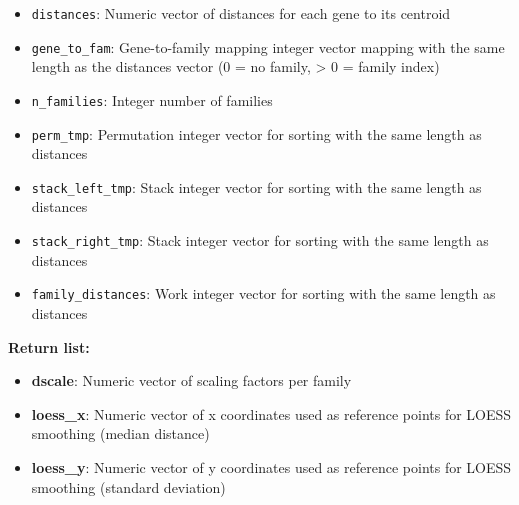 \documentclass[11pt]{article}
\begin{document}
\begin{enumerate}
\begin{enumerate}
	      	      \begin{itemize}
	      	      	\item \texttt{distances}: Numeric vector of distances for each gene to
	      	      	      its centroid
	      	      	      
	      	      	\item \texttt{gene\_to\_fam}: Gene-to-family mapping integer vector mapping
	      	      	      with the same length as the distances vector (0 = no family, \textgreater
	      	      	      0 = family index)
	      	      	      
	      	      	\item \texttt{n\_families}: Integer number of families
	      	      	      
	      	      	\item \texttt{perm\_tmp}: Permutation integer vector for sorting with
	      	      	      the same length as distances
	      	      	      
	      	      	\item \texttt{stack\_left\_tmp}: Stack integer vector for sorting with
	      	      	      the same length as distances
	      	      	      
	      	      	\item \texttt{stack\_right\_tmp}: Stack integer vector for sorting with
	      	      	      the same length as distances
	      	      	      
	      	      	\item \texttt{family\_distances}: Work integer vector for sorting with
	      	      	      the same length as distances
	      	      \end{itemize}
	      	      
	      	      \textbf{Return list:}
	      	      \begin{itemize}
	      	      	\item \textbf{dscale}: Numeric vector of scaling factors per family
	      	      	      
	      	      	\item \textbf{loess\_x}: Numeric vector of x coordinates used as reference
	      	      	      points for LOESS smoothing (median distance)
	      	      	      
	      	      	\item \textbf{loess\_y}: Numeric vector of y coordinates used as reference
	      	      	      points for LOESS smoothing (standard deviation)
	      	      	      

\end{itemize}
\end{enumerate}
\end{enumerate}
\end{document}

